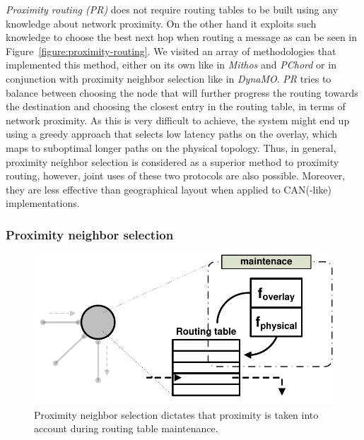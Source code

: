 \emph{Proximity routing (PR)} does not require routing tables to be built using any
knowledge about network proximity. On the other hand it exploits such knowledge
to choose the best next hop when routing a message as can be seen in
Figure~\ref{figure:proximity-routing}. We visited an array of methodologies that
implemented this method, either on its own like in \emph{Mithos} and
\emph{PChord} or in conjunction with proximity neighbor selection like in
\emph{DynaMO}. \emph{PR} tries to balance between choosing the node that will
further progress the routing towards the destination and choosing the closest
entry in the routing table, in terms of network proximity. As this is very
difficult to achieve, the system might end up
using a greedy approach that selects low latency paths on the overlay, which
maps to suboptimal longer paths on the physical topology. Thus, in general,
proximity neighbor selection is considered as a superior method to proximity
routing, however, joint uses of these two protocols are also possible. Moreover,
they are less effective than geographical layout when applied to CAN(-like)
implementations.



%
%

\subsubsection{Proximity neighbor selection}

\begin{figure}[ht]
\centering
  \includegraphics[scale=0.4]{img/pdf/proximity-neighbor-selection.pdf}
\caption{Proximity neighbor selection dictates that proximity is taken into
account during routing table maintenance.}
\label{figure:proximity-neighbour-selection}
\end{figure}

